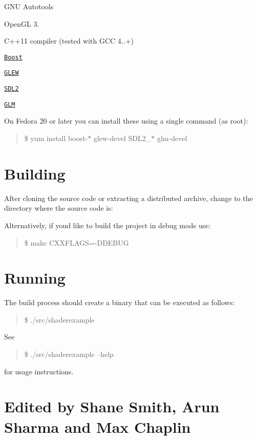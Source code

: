 
\begin{DoxyItemize}
\item G\+N\+U Autotools
\item Open\+G\+L 3.
\item C++11 compiler (tested with G\+C\+C 4..+)
\item \href{http://www.boost.org/}{\tt Boost}
\item \href{http://glew.sourceforge.net/}{\tt G\+L\+E\+W}
\item \href{https://www.libsdl.org/}{\tt S\+D\+L2}
\item \href{http://glm.g-truc.net/}{\tt G\+L\+M}
\end{DoxyItemize}

On Fedora 20 or later you can install these using a single command (as root)\+:

\begin{quote}
\$ yum install boost-\/$\ast$ glew-\/devel S\+D\+L2\+\_\+$\ast$ glm-\/devel \end{quote}


\section*{Building}

After cloning the source code or extracting a distributed archive, change to the directory where the source code is\+:




Alternatively, if you\textquotesingle{}d like to build the project in debug mode use\+:

\begin{quote}
\$ make C\+X\+X\+F\+L\+A\+G\+S=-\/\+D\+D\+E\+B\+U\+G \end{quote}


\section*{Running}

The build process should create a binary that can be executed as follows\+:

\begin{quote}
\$ ./src/shaderexample \end{quote}


See

\begin{quote}
\$ ./src/shaderexample --help \end{quote}


for usage instructions.

\section*{Edited by Shane Smith, Arun Sharma and Max Chaplin}